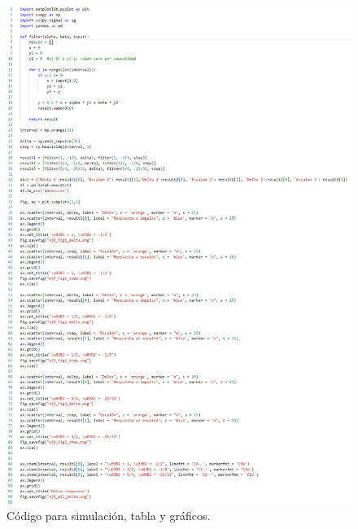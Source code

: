 \begin{figure}[H]
    \centering 
    \includegraphics [scale=0.6]{images/9code.png}
    \caption{Código para simulación, tabla y gráficos.} 
\end{figure}

